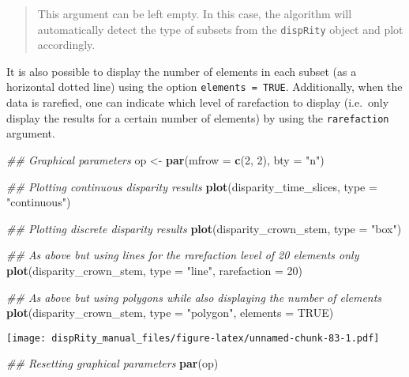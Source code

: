 \documentclass[
]{book}
\newenvironment{Shaded}{\begin{snugshade}}{\end{snugshade}}
\newcommand{\CommentTok}[1]{\textcolor[rgb]{0.56,0.35,0.01}{\textit{#1}}}
\newcommand{\DataTypeTok}[1]{\textcolor[rgb]{0.13,0.29,0.53}{#1}}
\newcommand{\DecValTok}[1]{\textcolor[rgb]{0.00,0.00,0.81}{#1}}
\newcommand{\KeywordTok}[1]{\textcolor[rgb]{0.13,0.29,0.53}{\textbf{#1}}}
\newcommand{\NormalTok}[1]{#1}
\newcommand{\OtherTok}[1]{\textcolor[rgb]{0.56,0.35,0.01}{#1}}
\newcommand{\StringTok}[1]{\textcolor[rgb]{0.31,0.60,0.02}{#1}}
\begin{document}
\begin{quote}
This argument can be left empty. In this case, the algorithm will automatically detect the type of subsets from the \texttt{dispRity} object and plot accordingly.
\end{quote}

It is also possible to display the number of elements in each subset (as a horizontal dotted line) using the option \texttt{elements\ =\ TRUE}.
Additionally, when the data is rarefied, one can indicate which level of rarefaction to display (i.e.~only display the results for a certain number of elements) by using the \texttt{rarefaction} argument.

\begin{Shaded}
\begin{Highlighting}[]
\CommentTok{\#\# Graphical parameters}
\NormalTok{op \textless{}{-}}\StringTok{ }\KeywordTok{par}\NormalTok{(}\DataTypeTok{mfrow =} \KeywordTok{c}\NormalTok{(}\DecValTok{2}\NormalTok{, }\DecValTok{2}\NormalTok{), }\DataTypeTok{bty =} \StringTok{"n"}\NormalTok{)}

\CommentTok{\#\# Plotting continuous disparity results}
\KeywordTok{plot}\NormalTok{(disparity\_time\_slices, }\DataTypeTok{type =} \StringTok{"continuous"}\NormalTok{)}

\CommentTok{\#\# Plotting discrete disparity results}
\KeywordTok{plot}\NormalTok{(disparity\_crown\_stem, }\DataTypeTok{type =} \StringTok{"box"}\NormalTok{)}

\CommentTok{\#\# As above but using lines for the rarefaction level of 20 elements only}
\KeywordTok{plot}\NormalTok{(disparity\_crown\_stem, }\DataTypeTok{type =} \StringTok{"line"}\NormalTok{, }\DataTypeTok{rarefaction =} \DecValTok{20}\NormalTok{)}

\CommentTok{\#\# As above but using polygons while also displaying the number of elements}
\KeywordTok{plot}\NormalTok{(disparity\_crown\_stem, }\DataTypeTok{type =} \StringTok{"polygon"}\NormalTok{, }\DataTypeTok{elements =} \OtherTok{TRUE}\NormalTok{)}
\end{Highlighting}
\end{Shaded}

\texttt{[image: dispRity\_manual\_files/figure-latex/unnamed-chunk-83-1.pdf]}

\begin{Shaded}
\begin{Highlighting}[]
\CommentTok{\#\# Resetting graphical parameters}
\KeywordTok{par}\NormalTok{(op)}
\end{Highlighting}
\end{Shaded}
\end{document}
